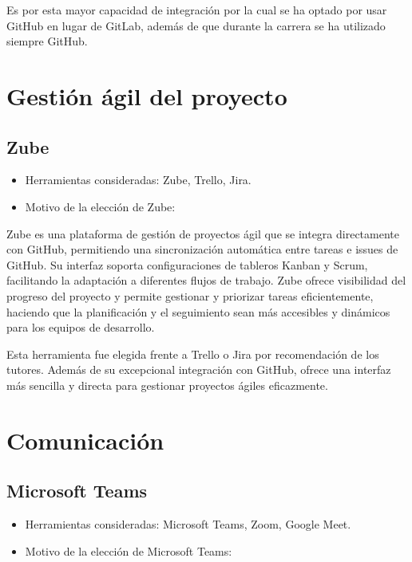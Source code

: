 Es por esta mayor capacidad de integración por la cual se ha optado por usar GitHub en lugar de GitLab, además de que durante la carrera se ha utilizado siempre GitHub.

\section{Gestión ágil del proyecto}\label{gestión-ágil-del-proyecto}

\subsection{Zube}\label{zube}

\begin{itemize}
    \item Herramientas consideradas: Zube, Trello, Jira.
    \item Motivo de la elección de Zube:
\end{itemize}

Zube es una plataforma de gestión de proyectos ágil que se integra directamente con GitHub, permitiendo una sincronización automática entre tareas e issues de GitHub. Su interfaz soporta configuraciones de tableros Kanban y Scrum, facilitando la adaptación a diferentes flujos de trabajo. Zube ofrece visibilidad del progreso del proyecto y permite gestionar y priorizar tareas eficientemente, haciendo que la planificación y el seguimiento sean más accesibles y dinámicos para los equipos de desarrollo.

Esta herramienta fue elegida frente a Trello o Jira por recomendación de los tutores. Además de su excepcional integración con GitHub, ofrece una interfaz más sencilla y directa para gestionar proyectos ágiles eficazmente.

\section{Comunicación}\label{comunicación}

\subsection{Microsoft Teams}\label{microsoft-teams}

\begin{itemize}
    \item Herramientas consideradas: Microsoft Teams, Zoom, Google Meet.
    \item Motivo de la elección de Microsoft Teams:
\end{itemize}

